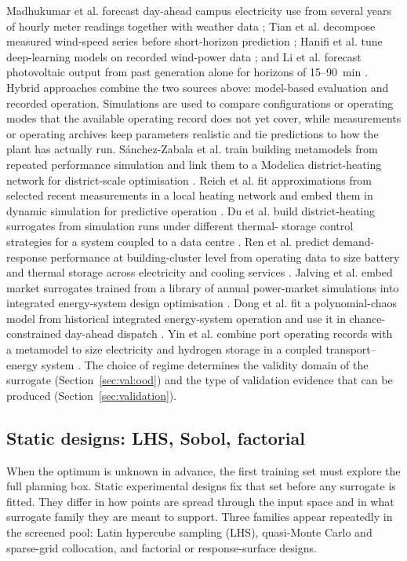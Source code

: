 Madhukumar et al. forecast day-ahead campus electricity use from several
years of hourly meter readings together with weather data
\cite{Madhukumar20228891}; Tian et al. decompose measured wind-speed
series before short-horizon prediction \cite{Tian2020}; Hanifi et al. tune
deep-learning models on recorded wind-power data \cite{Hanifi2024}; and
Li et al. forecast photovoltaic output from past generation alone for
horizons of 15--90~min \cite{Li2019}.
Hybrid approaches combine the two sources above: model-based
evaluation and recorded operation. Simulations are used to compare
configurations or operating modes that the available operating record
does not yet cover, while measurements or operating archives keep
parameters realistic and tie predictions to how the plant has actually
run. Sánchez-Zabala et al. train building
metamodels from repeated performance simulation and link them to a
Modelica district-heating network for district-scale optimisation
\cite{Sánchez-Zabala2024}. Reich et al. fit approximations from selected
recent measurements in a local heating network and embed them in dynamic
simulation for predictive operation \cite{Reich2020}. Du et al. build
district-heating surrogates from simulation runs under different thermal-
storage control strategies for a system coupled to a data centre
\cite{Du2025}. Ren et al. predict demand-response performance at
building-cluster level from operating data to size battery and thermal
storage across electricity and cooling services \cite{Ren2024}.
Jalving et al. embed market surrogates trained from a library of annual
power-market simulations into integrated energy-system design
optimisation \cite{Jalving2023}. Dong et al. fit a polynomial-chaos
model from historical integrated energy-system operation and use it in
chance-constrained day-ahead dispatch \cite{Dong2023}. Yin et al. combine
port operating records with a metamodel to size electricity and hydrogen
storage in a coupled transport--energy system \cite{Yin2024}.
The choice of regime determines the validity domain of the surrogate
(Section~\ref{sec:val:ood}) and the type of validation evidence that
can be produced (Section~\ref{sec:validation}).

\subsection{Static designs: LHS, Sobol, factorial}
\label{sec:doe:static}

When the optimum is unknown in advance, the first training set must
explore the full planning box. Static experimental designs fix
that set before any surrogate is fitted. They differ in how points are
spread through the input space and in what surrogate family they are
meant to support. Three families appear repeatedly in the screened
pool: Latin hypercube sampling (LHS), quasi-Monte Carlo and
sparse-grid collocation, and factorial or response-surface designs.


